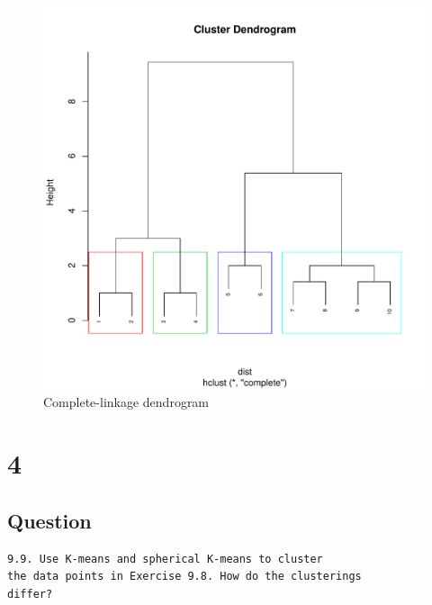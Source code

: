 \documentclass[letterpaper,11pt]{article}
\newcommand*{\srcPath}{../src}%
\begin{document}
\begin{figure}[h]
\centering
\includegraphics[scale=0.5]{complete-dendro.pdf}
\caption{Complete-linkage dendrogram}
\label{fig:7}
\end{figure}

% 

\clearpage


\section*{4}

\subsection*{Question}

\begin{verbatim}
9.9. Use K-means and spherical K-means to cluster 
the data points in Exercise 9.8. How do the clusterings 
differ?
\end{verbatim}
\end{document}
